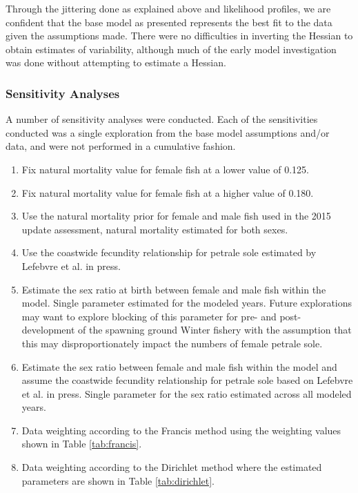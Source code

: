 \documentclass[12pt,]{article}
\begin{document}
Through the jittering done as explained above and likelihood profiles,
we are confident that the base model as presented represents the best
fit to the data given the assumptions made. There were no difficulties
in inverting the Hessian to obtain estimates of variability, although
much of the early model investigation was done without attempting to
estimate a Hessian.

\subsubsection{Sensitivity Analyses}\label{sensitivity-analyses}

A number of sensitivity analyses were conducted. Each of the
sensitivities conducted was a single exploration from the base model
assumptions and/or data, and were not performed in a cumulative fashion.

\begin{enumerate}

  \item Fix natural mortality value for female fish at a lower value of 0.125.
  
  \item Fix natural mortality value for female fish at a higher value of 0.180.
  
  \item Use the natural mortality prior for female and male fish used in the 2015 update assessment, natural mortality estimated for both sexes.
  
  \item Use the coastwide fecundity relationship for petrale sole estimated by Lefebvre et al. in press.
  
  \item Estimate the sex ratio at birth between female and male fish within the model. Single parameter estimated for the modeled years.  Future explorations may want to explore blocking of this parameter for pre- and post-development of the spawning ground Winter fishery with the assumption that this may disproportionately impact the numbers of female petrale sole.
  
  \item Estimate the sex ratio between female and male fish within the model and assume the coastwide fecundity relationship for petrale sole based on Lefebvre et al. in press. Single parameter for the sex ratio estimated across all modeled years. 
  
  \item Data weighting according to the Francis method using the weighting values shown in Table \ref{tab:francis}. 
  
  \item Data weighting according to the Dirichlet method where the estimated parameters are shown in Table \ref{tab:dirichlet}. 
  
\end{enumerate}
\end{document}
